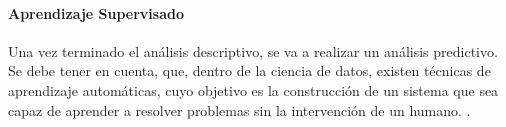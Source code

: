 
\paragraph{Aprendizaje Supervisado} 

Una vez terminado el análisis descriptivo, se va a realizar un análisis predictivo. Se debe tener en cuenta, que, dentro de la ciencia de datos, existen técnicas de aprendizaje automáticas, cuyo objetivo es la construcción de un sistema que sea capaz de aprender a resolver problemas sin la intervención de un humano. \cite{Marin2018}.

